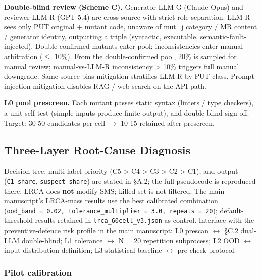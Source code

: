 \documentclass[review,12pt,authoryear]{elsarticle}
\begin{document}
\textbf{Double-blind review (Scheme C).} Generator LLM-G (Claude Opus)
and reviewer LLM-R (GPT-5.4) are cross-source with strict role
separation. LLM-R sees only PUT original + mutant code, unaware of
mut\_j category / MR content / generator identity, outputting a triple
(syntactic, executable, semantic-fault-injected). Double-confirmed
mutants enter pool; inconsistencies enter manual arbitration ($\leq$ 10\%).
From the double-confirmed pool, 20\% is sampled for manual review;
manual-vs-LLM-R inconsistency \textgreater{} 10\% triggers full manual
downgrade. Same-source bias mitigation stratifies LLM-R by PUT class.
Prompt-injection mitigation disables RAG / web search on the API path.

\textbf{L0 pool prescreen.} Each mutant passes static syntax (linters /
type checkers), a unit self-test (simple inputs produce finite output),
and double-blind sign-off. Target: 30-50 candidates per cell $\to$ 10-15
retained after prescreen.

\subsection{Three-Layer Root-Cause Diagnosis}\label{c.4-lrca-three-layer-execution-full}

Decision tree, multi-label priority (C5 \textgreater{} C4 \textgreater{}
C3 \textgreater{} C2 \textgreater{} C1), and output (\texttt{C1\_share},
\texttt{suspect\_share}) are stated in §A.2; the full pseudocode is
reproduced there. LRCA does \textbf{not} modify SMS; killed set is not
filtered. The main manuscript's LRCA-mass results use the best calibrated combination
(\texttt{ood\_band\ =\ 0.02,\ tolerance\_multiplier\ =\ 3.0,\ repeats\ =\ 20});
default-threshold results retained in \texttt{lrca\_60cell\_v3.json} as
control. Interface with the preventive-defence risk profile in the main manuscript: L0 prescan $\leftrightarrow$ §C.2 dual-LLM
double-blind; L1 tolerance $\leftrightarrow$ N = 20 repetition subprocess; L2 OOD $\leftrightarrow$
input-distribution definition; L3 statistical baseline $\leftrightarrow$ pre-check
protocol.

\subsubsection{Pilot calibration}\label{c.4.1-pilot-calibration-37-operators-k-1020}
\end{document}

